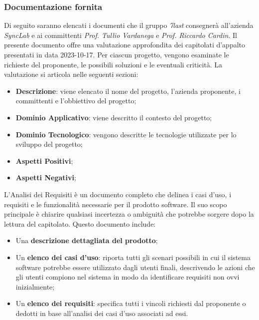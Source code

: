\subsubsection{Documentazione fornita}
Di seguito saranno elencati i documenti che il gruppo \textit{7last} consegnerà all'azienda \textit{SyncLab} e ai committenti \textit{Prof. Tullio Vardanega} e \textit{Prof. Riccardo Cardin}.
Il presente documento offre una valutazione approfondita dei capitolati d'appalto presentati in data 2023-10-17. Per ciascun progetto, vengono esaminate le richieste del proponente, le possibili soluzioni e le eventuali criticità.
La valutazione si articola nelle seguenti sezioni:
\begin{itemize}
	\item \textbf{Descrizione}: viene elencato il nome del progetto, l'azienda proponente, i committenti e l'obbiettivo del progetto;
	\item \textbf{Dominio Applicativo}: viene descritto il contesto del progetto;
	\item \textbf{Dominio Tecnologico}: vengono descritte le tecnologie utilizzate per lo sviluppo del progetto;
	\item \textbf{Aspetti Positivi};
	\item \textbf{Aspetti Negativi};
\end{itemize}

L'Analisi dei Requisiti è un documento completo che delinea i casi d'uso, i requisiti e le funzionalità necessarie per il prodotto software.
Il suo scopo principale è chiarire qualsiasi incertezza o ambiguità che potrebbe sorgere dopo la lettura del capitolato.
Questo documento include:
\begin{itemize}
	\item Una \textbf{descrizione dettagliata del prodotto};
	\item Un \textbf{elenco dei casi d'uso}: riporta tutti gli scenari possibili in cui il sistema software potrebbe essere utilizzato dagli utenti finali, descrivendo le azioni che gli utenti compiono nel sistema in modo da identificare requisiti non ovvi inizialmente;
	\item Un \textbf{elenco dei requisiti}: specifica tutti i vincoli richiesti dal proponente o dedotti in base all'analisi dei casi d'uso associati ad essi.
\end{itemize}


